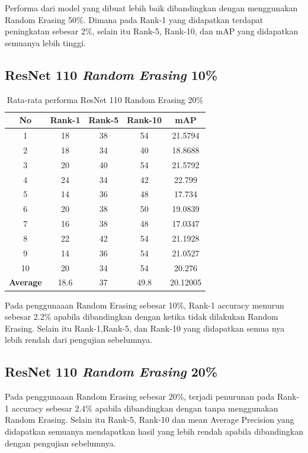 Performa dari model yang dibuat lebih baik dibandingkan dengan menggunakan Random Erasing 50\%. Dimana pada Rank-1 yang didapatkan terdapat peningkatan sebesar 2\%, selain itu Rank-5, Rank-10, dan mAP yang didapatkan semuanya lebih tinggi.

\subsection{ResNet 110 \textit{Random Erasing} 10\%}

\begin{longtable}{|c|c|c|c|c|}
	\caption{Rata-rata performa ResNet 110 Random Erasing 20\%}
	\label{tabel: 31}\\
	\hline
	\rowcolor[HTML]{C0C0C0}
	\textbf{No} &\textbf{Rank-1} & \textbf{Rank-5} & \textbf{Rank-10} & \textbf{mAP} \\
	\hline
	1 &18 &38 &54 &21.5794 \\
	2 &18 &34 &40 &18.8688 \\
	3 &20 &40 &54 &21.5792 \\
	4 &24 &34 &42 &22.799 \\
	5 &14 &36 &48 &17.734 \\
	6 &20 &38 &50 &19.0839 \\
	7 &16 &38 &48 &17.0347 \\
	8 &22 &42 &54 &21.1928 \\
	9 &14 &36 &54 &21.0527 \\
	10 &20 &34 &54 &20.276 \\
	\hline
	\textbf{Average} & 18.6 & 37 & 49.8 &20.12005 \\
	\hline
\end{longtable}

\vspace{2ex}
Pada penggunaaan Random Erasing sebesar 10\%, Rank-1 accuracy menurun sebesar 2.2\% apabila dibandingkan dengan ketika tidak dilakukan Random Erasing. Selain itu Rank-1,Rank-5, dan Rank-10 yang didapatkan semua nya lebih rendah dari pengujian sebelumnya.

\subsection{ResNet 110 \textit{Random Erasing} 20\%}
Pada penggunaaan Random Erasing sebesar 20\%, terjadi penurunan pada Rank-1 accuracy sebesar 2.4\% apabila dibandingkan dengan tanpa menggunakan Random Erasing. Selain itu Rank-5, Rank-10 dan mean Average Precision yang didapatkan semuanya mendapatkan hasil yang lebih rendah apabila dibandingkan dengan pengujian sebelumnya.

